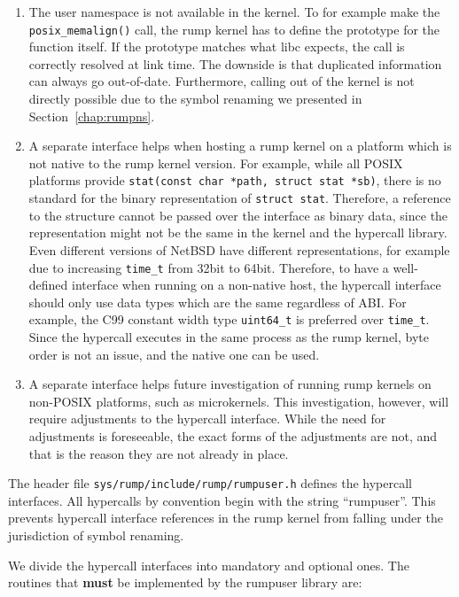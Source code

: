 \begin{enumerate}

\item The user namespace is not available in the kernel.
To for example make the \verb+posix_memalign()+ call,
the rump kernel has to define the prototype for the function itself.
If the prototype matches what libc expects, the call is correctly
resolved at link time.  The downside is that duplicated information
can always go out-of-date.  Furthermore, calling out of the kernel
is not directly possible due to the symbol renaming we presented
in Section~\ref{chap:rumpns}.

\item A separate interface helps when hosting a rump kernel on a platform
which is not native to the rump kernel version.  For example,
while all POSIX platforms provide
\verb+stat(const char *path, struct stat *sb)+, there is no standard
for the binary representation of \verb+struct stat+.  Therefore, a
reference to the structure cannot be passed over the interface as
binary data, since the representation might not be the same in the kernel
and the hypercall library.  Even different versions of NetBSD have
different representations, for example due to increasing \verb+time_t+
from 32bit to 64bit.  Therefore, to have a well-defined interface
when running on a non-native host, the hypercall interface should
only use data types which are the same regardless of ABI.  For
example, the C99 constant width type \verb+uint64_t+ is preferred
over \verb+time_t+.  Since the hypercall executes in the same
process as the rump kernel, byte order is not an issue, and the
native one can be used.

\item A separate interface helps future investigation of running
rump kernels on non-POSIX platforms, such as microkernels.
This investigation, however, will require adjustments to the
hypercall interface.  While the need for adjustments is foreseeable,
the exact forms of the adjustments are not, and that is the reason
they are not already in place.
\end{enumerate}

The header file \texttt{sys/rump/include/rump/rumpuser.h} defines the
hypercall interfaces.  All hypercalls by convention begin with the string
``rumpuser''.  This prevents hypercall interface references in the rump
kernel from falling under the jurisdiction of symbol renaming.

We divide the hypercall interfaces into mandatory and optional ones.
The routines that \textbf{must} be implemented by the rumpuser library
are:

